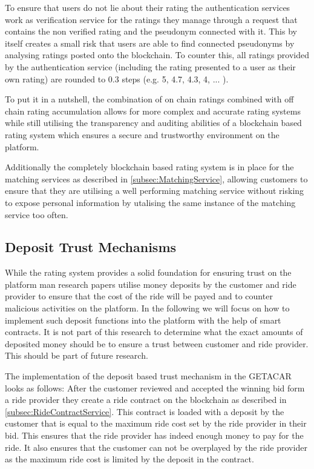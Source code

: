 To ensure that users do not lie about their rating the authentication services work as verification service for the ratings they manage through a request that contains the non verified rating and the pseudonym connected with it. This by itself creates a small risk that users are able to find connected pseudonyms by analysing ratings posted onto the blockchain. To counter this, all ratings provided by the authentication service (including the rating presented to a user as their own rating) are rounded to 0.3 steps (e.g. 5, 4.7, 4.3, 4, ... ). 


To put it in a nutshell, the combination of on chain ratings combined with off chain rating accumulation allows for more complex and accurate rating systems while still utilising the transparency and auditing abilities of a blockchain based rating system which ensures a secure and trustworthy environment on the platform.

Additionally the completely blockchain based rating system is in place for the matching services as described in \ref{subsec:MatchingService}, allowing customers to ensure that they are utilising a well performing matching service without risking to expose personal information by utalising the same instance of the matching service too often.

\subsection{Deposit Trust Mechanisms}\label{subsec:DepositTrust}
While the rating system provides a solid foundation for ensuring trust on the platform man research papers utilise money deposits by the customer and ride provider to ensure that the cost of the ride will be payed and to counter malicious activities on the platform. In the following we will focus on how to implement such deposit functions into the platform with the help of smart contracts. It is not part of this research to determine what the exact amounts of deposited money should be to ensure a trust between customer and ride provider. This should be part of future research.

The implementation of the deposit based trust mechanism in the GETACAR looks as follows:
After the customer reviewed and accepted the winning bid form a ride provider they create a ride contract on the blockchain as described in \ref{subsec:RideContractService}. This contract is loaded with a deposit by the customer that is equal to the maximum ride cost set by the ride provider in their bid. This ensures that the ride provider has indeed enough money to pay for the ride. It also ensures that the customer can not be overplayed by the ride provider as the maximum ride cost is limited by the deposit in the contract. 

